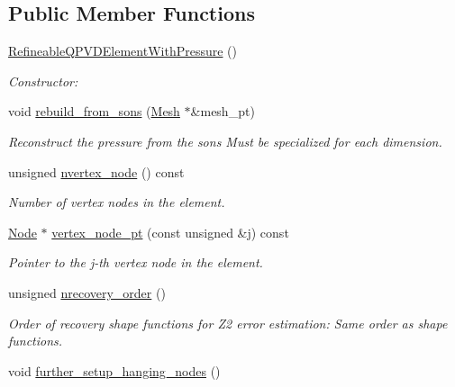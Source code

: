 \subsection*{Public Member Functions}
\begin{DoxyCompactItemize}
\item 
\hyperlink{classoomph_1_1RefineableQPVDElementWithPressure_a7d1562f43683b3375c5fe0c4983b6db7}{Refineable\+Q\+P\+V\+D\+Element\+With\+Pressure} ()
\begin{DoxyCompactList}\small\item\em Constructor\+: \end{DoxyCompactList}\item 
void \hyperlink{classoomph_1_1RefineableQPVDElementWithPressure_ad3d90fabb0a853d969b8b3a0115bcabc}{rebuild\+\_\+from\+\_\+sons} (\hyperlink{classoomph_1_1Mesh}{Mesh} $\ast$\&mesh\+\_\+pt)
\begin{DoxyCompactList}\small\item\em Reconstruct the pressure from the sons Must be specialized for each dimension. \end{DoxyCompactList}\item 
unsigned \hyperlink{classoomph_1_1RefineableQPVDElementWithPressure_a89f62fc2fdb02ee78f36eef6b7d2f434}{nvertex\+\_\+node} () const
\begin{DoxyCompactList}\small\item\em Number of vertex nodes in the element. \end{DoxyCompactList}\item 
\hyperlink{classoomph_1_1Node}{Node} $\ast$ \hyperlink{classoomph_1_1RefineableQPVDElementWithPressure_a9b151e6bb69794a4837306b7f7f92a86}{vertex\+\_\+node\+\_\+pt} (const unsigned \&j) const
\begin{DoxyCompactList}\small\item\em Pointer to the j-\/th vertex node in the element. \end{DoxyCompactList}\item 
unsigned \hyperlink{classoomph_1_1RefineableQPVDElementWithPressure_a84afe8c95d37e68a32d7379700f838af}{nrecovery\+\_\+order} ()
\begin{DoxyCompactList}\small\item\em Order of recovery shape functions for Z2 error estimation\+: Same order as shape functions. \end{DoxyCompactList}\item 
void \hyperlink{classoomph_1_1RefineableQPVDElementWithPressure_a649a8dd890c32322ad55c70100f02883}{further\+\_\+setup\+\_\+hanging\+\_\+nodes} ()

\end{DoxyCompactItemize}

